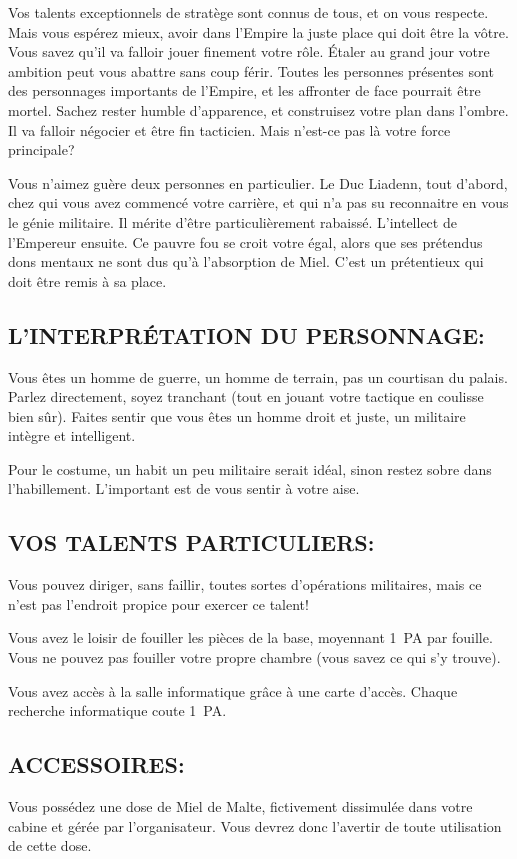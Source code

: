 \documentclass[14pt,twocolumn]{extarticle}
\begin{document}
Vos talents exceptionnels de stratège sont connus de tous, et on vous respecte.
Mais vous espérez mieux, avoir dans l'Empire la juste place qui doit être la
vôtre. Vous savez qu'il va falloir jouer finement votre rôle. Étaler au grand
jour votre ambition peut vous abattre sans coup férir. Toutes les personnes
présentes sont des personnages importants de l'Empire, et les affronter de face
pourrait être mortel. Sachez rester humble d'apparence, et construisez votre
plan dans l'ombre. Il va falloir négocier et être fin tacticien. Mais n'est-ce
pas là votre force principale?

Vous n'aimez guère deux personnes en particulier. Le Duc Liadenn, tout d'abord,
chez qui vous avez commencé votre carrière, et qui n'a pas su reconnaitre en
vous le génie militaire. Il mérite d'être particulièrement rabaissé.
L'intellect de l'Empereur ensuite. Ce pauvre fou se croit votre égal, alors que
ses prétendus dons mentaux ne sont dus qu'à l'absorption de Miel. C'est un
prétentieux qui doit être remis à sa place.

\subsection{L'INTERPRÉTATION DU PERSONNAGE:}

Vous êtes un homme de guerre, un homme de terrain, pas un courtisan du palais.
Parlez directement, soyez tranchant (tout en jouant votre tactique en coulisse
bien sûr). Faites sentir que vous êtes un homme droit et juste, un militaire
intègre et intelligent.

Pour le costume, un habit un peu militaire serait idéal, sinon restez sobre
dans l'habillement. L'important est de vous sentir à votre aise.

\subsection{VOS TALENTS PARTICULIERS:}

Vous pouvez diriger, sans faillir, toutes sortes d'opérations militaires, mais
ce n'est pas l'endroit propice pour exercer ce talent!

Vous avez le loisir de fouiller les pièces de la base, moyennant 1~PA par
fouille. Vous ne pouvez pas fouiller votre propre chambre (vous savez ce qui
s'y trouve).

Vous avez accès à la salle informatique grâce à une carte d'accès. Chaque
recherche informatique coute 1~PA.

\subsection{ACCESSOIRES:}

Vous possédez une dose de Miel de Malte, fictivement dissimulée dans votre
cabine et gérée par l'organisateur. Vous devrez donc l'avertir de toute
utilisation de cette dose.
\end{document}
